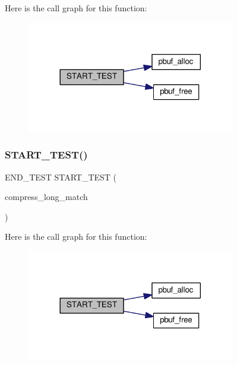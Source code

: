 Here is the call graph for this function\+:
\nopagebreak
\begin{figure}[H]
\begin{center}
\leavevmode
\includegraphics[width=257pt]{openmote-cc2538_2lwip_2test_2unit_2mdns_2test__mdns_8c_aee1309a46f2218677f89511c0820c4e1_cgraph}
\end{center}
\end{figure}
\mbox{\label{openmote-cc2538_2lwip_2test_2unit_2mdns_2test__mdns_8c_a16f625c7c9805544ff8727d50ba2829a}} 
\subsubsection{\texorpdfstring{S\+T\+A\+R\+T\+\_\+\+T\+E\+S\+T()}{START\_TEST()}\hspace{0.1cm}{\footnotesize\ttfamily [29/29]}}
{\footnotesize\ttfamily E\+N\+D\+\_\+\+T\+E\+ST S\+T\+A\+R\+T\+\_\+\+T\+E\+ST (\begin{DoxyParamCaption}\item[{compress\+\_\+long\+\_\+match}]{ }\end{DoxyParamCaption})}

Here is the call graph for this function\+:
\nopagebreak
\begin{figure}[H]
\begin{center}
\leavevmode
\includegraphics[width=257pt]{openmote-cc2538_2lwip_2test_2unit_2mdns_2test__mdns_8c_a16f625c7c9805544ff8727d50ba2829a_cgraph}
\end{center}
\end{figure}
